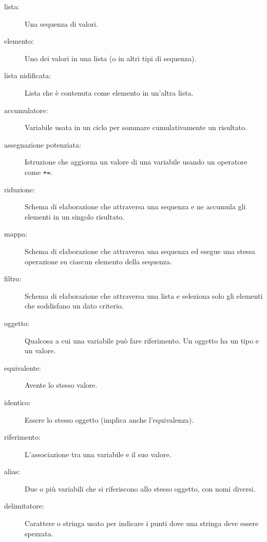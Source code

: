 \documentclass[10pt]{book}
\begin{document}
\begin{description}

\item[lista:] Una sequenza di valori.

\item[elemento:] Uno dei valori in una lista (o in altri tipi di sequenza).

\item[lista nidificata:] Lista che è contenuta come elemento in un'altra lista.

\item[accumulatore:] Variabile usata in un ciclo per sommare cumulativamente un risultato.

\item[assegnazione potenziata:] Istruzione che aggiorna un valore di una variabile usando un operatore come \verb"+=".

\item[riduzione:] Schema di elaborazione che attraversa una sequenza e ne accumula gli elementi in un singolo risultato.

\item[mappa:] Schema di elaborazione che attraversa una sequenza ed esegue una stessa operazione su ciascun elemento della sequenza.

\item[filtro:] Schema di elaborazione che attraversa una lista e seleziona solo gli elementi che soddisfano un dato criterio.

\item[oggetto:] Qualcosa a cui una variabile può fare riferimento. Un oggetto ha un tipo e un valore.

\item[equivalente:] Avente lo stesso valore.

\item[identico:] Essere lo stesso oggetto (implica anche l'equivalenza).

\item[riferimento:] L'associazione tra una variabile e il suo valore.

\item[alias:] Due o più variabili che si riferiscono allo stesso oggetto, con nomi diversi.

\item[delimitatore:] Carattere o stringa usato per indicare i punti dove una stringa deve essere spezzata.

\end{description}
\end{document}
